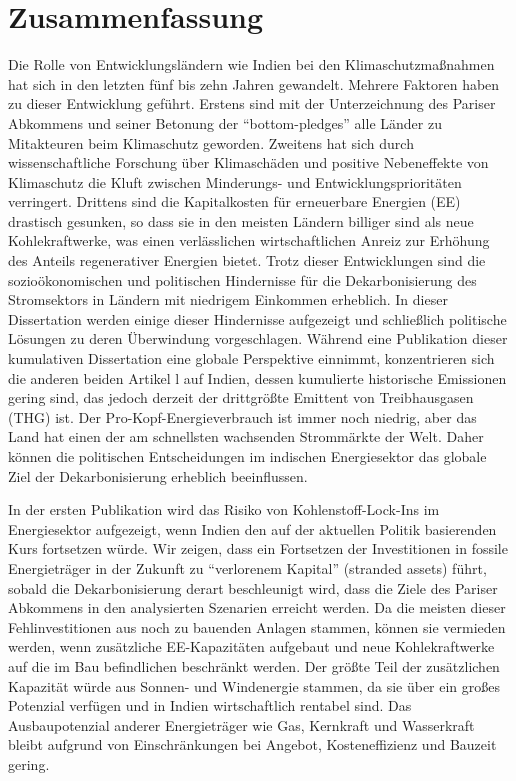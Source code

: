 \documentclass[../thesis.tex]{subfiles}
\begin{document}
\chapter*{Zusammenfassung}
Die Rolle von Entwicklungsländern wie Indien bei den Klimaschutzma\ss nahmen hat sich in den letzten fünf bis zehn Jahren gewandelt. Mehrere Faktoren haben zu dieser Entwicklung geführt. Erstens sind mit der Unterzeichnung des Pariser Abkommens und seiner Betonung der "`bottom-pledges"' %
 alle Länder zu Mitakteuren beim Klimaschutz geworden. Zweitens hat sich durch wissenschaftliche Forschung über Klimaschäden und positive Nebeneffekte von Klimaschutz die Kluft zwischen Minderungs- und Entwicklungsprioritäten verringert. Drittens sind die Kapitalkosten für erneuerbare Energien (EE) drastisch gesunken, so dass sie in den meisten Ländern billiger sind als neue Kohlekraftwerke, was einen verlässlichen wirtschaftlichen Anreiz zur Erhöhung des Anteils regenerativer Energien bietet. Trotz dieser Entwicklungen sind die sozioökonomischen und politischen Hindernisse für die Dekarbonisierung des Stromsektors in Ländern mit niedrigem Einkommen erheblich. In dieser Dissertation werden einige dieser Hindernisse aufgezeigt und schlie\ss lich politische Lösungen zu deren Überwindung vorgeschlagen. Während eine Publikation dieser kumulativen Dissertation eine globale Perspektive einnimmt, konzentrieren sich die anderen beiden Artikel l auf Indien, dessen kumulierte historische Emissionen gering sind, das jedoch derzeit der drittgrö\ss te Emittent von Treibhausgasen (THG) ist. Der Pro-Kopf-Energieverbrauch ist immer noch niedrig, aber das Land hat einen der am schnellsten wachsenden Strommärkte der Welt. Daher können die politischen Entscheidungen im indischen Energiesektor das globale Ziel der Dekarbonisierung erheblich beeinflussen.

In der ersten Publikation wird das Risiko von Kohlenstoff-Lock-Ins im Energiesektor aufgezeigt, wenn Indien den auf der aktuellen Politik basierenden Kurs fortsetzen würde. Wir zeigen, dass ein Fortsetzen der Investitionen in fossile Energieträger in der Zukunft zu "`verlorenem Kapital"' (stranded assets) führt, sobald die Dekarbonisierung derart beschleunigt wird, dass die Ziele des Pariser Abkommens in den analysierten Szenarien erreicht werden. Da die meisten dieser Fehlinvestitionen aus noch zu bauenden Anlagen stammen, können sie vermieden werden, wenn zusätzliche EE-Kapazitäten aufgebaut und neue Kohlekraftwerke auf die im Bau befindlichen beschränkt werden. Der grö\ss te Teil der zusätzlichen Kapazität würde aus Sonnen- und Windenergie stammen, da sie über ein gro\ss es Potenzial verfügen und in Indien wirtschaftlich rentabel sind. Das Ausbaupotenzial anderer Energieträger wie Gas, Kernkraft und Wasserkraft bleibt aufgrund von Einschränkungen bei Angebot, Kosteneffizienz und Bauzeit gering.
\end{document}
